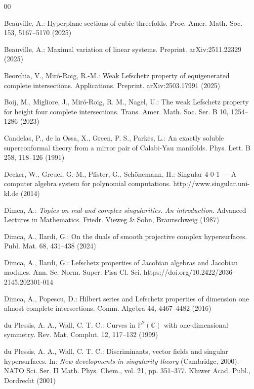 \documentclass[11pt]{amsart}
\theoremstyle{plain}
\theoremstyle{definition}
\numberwithin{equation}{section}
\begin{document}
\begin{thebibliography}{00}

Beauville, A.: Hyperplane sections of cubic threefolds. Proc. Amer. Math. Soc. 153, 5167--5170 (2025)

Beauville, A.: Maximal variation of linear systems. Preprint. arXiv:2511.22329 (2025)

Beorchia, V., Mir\'o-Roig, R.-M.: Weak Lefschetz property of equigenerated complete intersections. Applications. Preprint. arXiv:2503.17991 (2025)

Boij, M., Migliore, J., Mir\'o-Roig, R. M., Nagel, U.: The weak Lefschetz property for height four complete intersections. Trans. Amer. Math. Soc. Ser. B 10, 1254--1286 (2023)

Candelas, P., de la Ossa, X., Green, P. S., Parkes, L.: An exactly soluble superconformal theory from a mirror pair of Calabi-Yau manifolds. Phys. Lett. B 258, 118--126 (1991)

Decker, W., Greuel, G.-M., Pfister, G., Sch{\"o}nemann, H.: {\sc Singular} 4-0-1 --- A computer algebra system for polynomial computations. http://www.singular.uni-kl.de (2014)

Dimca, A.: \textit{Topics on real and complex singularities. An introduction}. Advanced Lectures in Mathematics. Friedr. Vieweg \& Sohn, Braunschweig (1987)

Dimca, A., Ilardi, G.: On the duals of smooth projective complex hypersurfaces. Publ. Mat. 68, 431--438 (2024)

Dimca, A., Ilardi, G.: Lefschetz properties of Jacobian algebras and Jacobian modules. Ann. Sc. Norm. Super. Pisa Cl. Sci. https://doi.org/10.2422/2036-2145.202301-014

Dimca, A., Popescu, D.: Hilbert series and Lefschetz properties of dimension one almost complete intersections. Comm. Algebra 44, 4467--4482 (2016)

du Plessis, A. A., Wall, C. T. C.: Curves in $\mathbb{P}^2(\mathbb{C})$ with one-dimensional symmetry. Rev. Mat. Complut. 12, 117--132 (1999)

du Plessis, A. A., Wall, C. T. C.: Discriminants, vector fields and singular hypersurfaces. In: \textit{New developments in singularity theory} (Cambridge, 2000). NATO Sci. Ser. II Math. Phys. Chem., vol. 21, pp. 351--377. Kluwer Acad. Publ., Dordrecht (2001)


\end{thebibliography}
\end{document}
